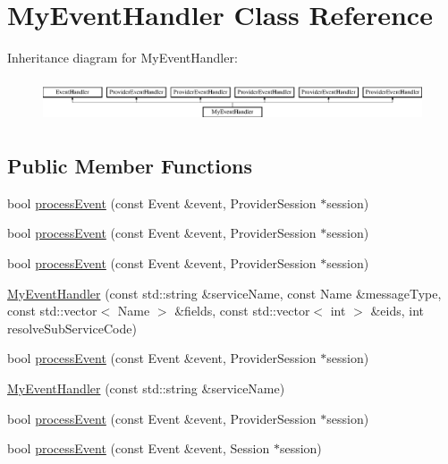 \hypertarget{class_my_event_handler}{}\section{My\+Event\+Handler Class Reference}
\label{class_my_event_handler}
Inheritance diagram for My\+Event\+Handler\+:\begin{figure}[H]
\begin{center}
\leavevmode
\includegraphics[height=1.278539cm]{class_my_event_handler}
\end{center}
\end{figure}
\subsection*{Public Member Functions}
\begin{DoxyCompactItemize}
\item 
bool \hyperlink{class_my_event_handler_a723ee0f5f887ae0bb61356d4b39a7a96}{process\+Event} (const Event \&event, Provider\+Session $\ast$session)
\item 
bool \hyperlink{class_my_event_handler_a723ee0f5f887ae0bb61356d4b39a7a96}{process\+Event} (const Event \&event, Provider\+Session $\ast$session)
\item 
bool \hyperlink{class_my_event_handler_a723ee0f5f887ae0bb61356d4b39a7a96}{process\+Event} (const Event \&event, Provider\+Session $\ast$session)
\item 
\hyperlink{class_my_event_handler_aee336603e96d800244bedf1522b4c453}{My\+Event\+Handler} (const std\+::string \&service\+Name, const Name \&message\+Type, const std\+::vector$<$ Name $>$ \&fields, const std\+::vector$<$ int $>$ \&eids, int resolve\+Sub\+Service\+Code)
\item 
bool \hyperlink{class_my_event_handler_a723ee0f5f887ae0bb61356d4b39a7a96}{process\+Event} (const Event \&event, Provider\+Session $\ast$session)
\item 
\hyperlink{class_my_event_handler_a96e1d640a9e70e1f52aa06762dbf136a}{My\+Event\+Handler} (const std\+::string \&service\+Name)
\item 
bool \hyperlink{class_my_event_handler_a723ee0f5f887ae0bb61356d4b39a7a96}{process\+Event} (const Event \&event, Provider\+Session $\ast$session)
\item 
bool \hyperlink{class_my_event_handler_afff2c0ef504e5c73cd98215024ce51c7}{process\+Event} (const Event \&event, Session $\ast$session)
\end{DoxyCompactItemize}



